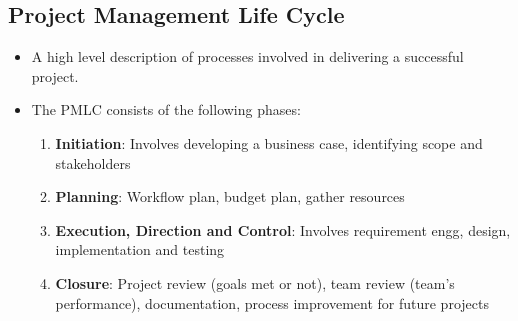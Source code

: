 \documentclass{article}
\begin{document}
\subsection{Project Management Life Cycle}
\label{pmlc}
\begin{itemize}
    \item A high level description of processes involved in delivering a successful project. 
    
    \item The PMLC consists of the following phases:
    \begin{enumerate}
        \item \textbf{Initiation}: Involves developing a business case, identifying scope and stakeholders 
        
        \item \textbf{Planning}: Workflow plan, budget plan, gather resources
        
        \item \textbf{Execution, Direction and Control}: Involves requirement engg, design, implementation and testing 
        
        \item \textbf{Closure}: Project review (goals met or not), team review (team's performance), documentation, process improvement for future projects
    \end{enumerate}
\end{itemize}
\end{document}
